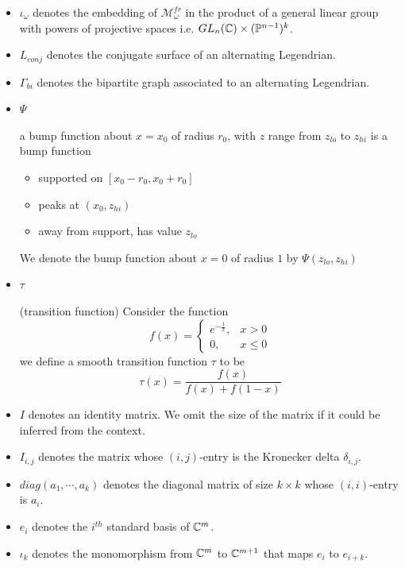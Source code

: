 \begin{itemize}
\item $\iota_\omega$ denotes the embedding of $\mathcal{M}_\omega^{fr}$ in the product of a general linear group with powers of projective spaces i.e. $GL_n(\mathbb{C}) \times (\mathbb{P}^{n-1})^k$.

\item $L_{conj}$ denotes the conjugate surface of an alternating Legendrian.

\item $\Gamma_{bi}$ denotes the bipartite graph associated to an alternating Legendrian.

\item $\Psi$ 
\begin{definition}
a bump function about $x=x_0$ of radius $r_0$, with $z$ range from $z_{lo}$ to $z_{hi}$ is a bump function 
\begin{itemize}
\item supported on $[x_0 - r_0,x_0 + r_0]$
\item peaks at $(x_0,z_{hi})$
\item away from support, has value $z_{lo}$
\end{itemize}
We denote the bump function about $x=0$ of radius $1$ by $\Psi(z_{lo},z_{hi})$
\end{definition}


\item $\tau$
\begin{definition}
(transition function) Consider the function
\[
f(x) =
\begin{cases}
e^{-\frac{1}{x}}, & x > 0 \\
0, & x \leq 0
\end{cases}
\]
we define a smooth transition function $\tau$ to be
\[
\tau(x) = \frac{f(x)}{f(x)+f(1-x)}
\]
\end{definition}

\item $I$ denotes an identity matrix. We omit the size of the matrix if it could be inferred from the context.

\item $I_{i,j}$ denotes the matrix whose $(i,j)$-entry is the Kronecker delta $\delta_{i,j}$.

\item $diag(a_1,\cdots, a_k)$ denotes the diagonal matrix of size $k\times k$ whose $(i,i)$-entry is $a_i$.

\item $e_i$ denotes the $i^{th}$ standard basis of $\mathbb{C}^m$.

\item $\iota_k$ denotes the monomorphism from $\mathbb{C}^m$ to $\mathbb{C}^{m+1}$ that maps $e_i$ to $e_{i+k}$.


\end{itemize}
